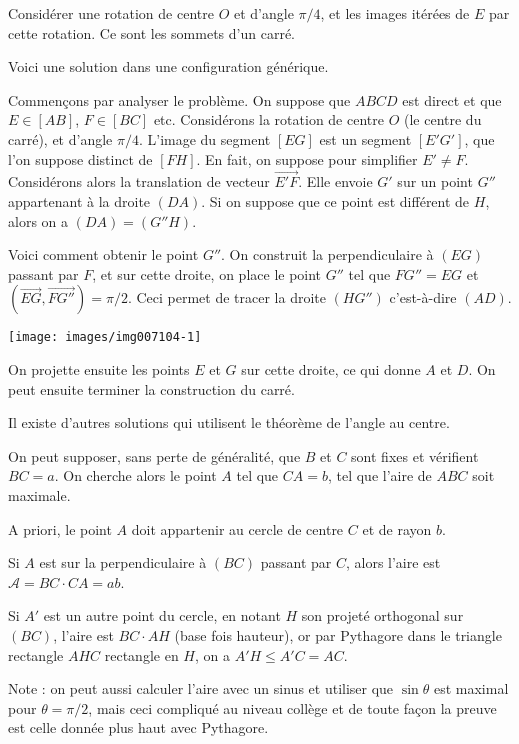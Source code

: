\begin{Soln}{69}
Considérer une rotation de centre $O$ et d'angle $\pi/4$, et les images itérées de $E$ par cette rotation. Ce sont les sommets d'un carré.
\end{Soln}
\begin{Soln}{70}
Voici une solution dans une configuration \og générique\fg.

Commençons par analyser le problème. On suppose que $ABCD$ est direct et que $E\in [AB]$, $F \in [BC]$ etc.
Considérons la rotation de centre $O$ (le centre du carré), et d'angle $\pi/4$. L'image du segment $[EG]$ est un segment $[E'G']$, que l'on suppose distinct de $[FH]$. En fait, on suppose pour simplifier $E'\neq F$. Considérons alors la translation de vecteur $\overrightarrow{E'F}$. Elle envoie $G'$ sur un point $G''$ appartenant à la droite $(DA)$. Si on suppose que ce point est différent de $H$, alors on a $(DA) = (G''H)$.

Voici comment obtenir le point $G''$. On construit la perpendiculaire à $(EG)$ passant par $F$, et sur cette droite, on place le point $G''$ tel que $FG''=EG$ et $(\overrightarrow{EG},\overrightarrow{FG''}) = \pi/2$. Ceci permet de tracer la droite $(HG'')$ c'est-à-dire $(AD)$.

\begin{center}
\texttt{[image: images/img007104-1]}
\end{center}

On projette ensuite les points $E$ et $G$ sur cette droite, ce qui donne $A$ et $D$. On peut ensuite terminer la construction du carré.

Il existe d'autres solutions qui utilisent le théorème de l'angle au centre.
\end{Soln}
\begin{Soln}{71}
On peut supposer, sans perte de généralité, que $B$ et $C$ sont fixes et vérifient $BC=a$. On cherche alors le point $A$ tel que $CA=b$, tel que l'aire de $ABC$ soit maximale.

A priori, le point $A$ doit appartenir au cercle de centre $C$ et de rayon $b$.

Si $A$ est sur la perpendiculaire à $(BC)$ passant par $C$, alors l'aire est $\mathcal A = BC\cdot CA = ab$.

Si $A'$ est un autre point du cercle, en notant $H$ son projeté orthogonal sur $(BC)$, l'aire est $BC\cdot AH$ (base fois hauteur), or par Pythagore dans le triangle rectangle $AHC$ rectangle en $H$, on a $A'H \leq A'C=AC$.

Note : on peut aussi calculer l'aire avec un sinus et utiliser que $\sin\theta$ est maximal pour $\theta=\pi/2$, mais ceci compliqué au niveau collège et de toute façon la preuve est celle donnée plus haut avec Pythagore.
\end{Soln}
